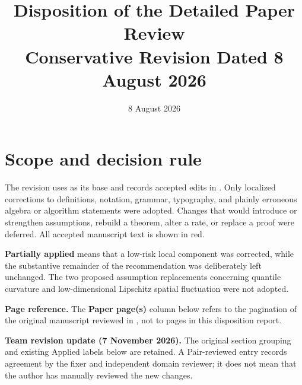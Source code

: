 \documentclass[10pt]{article}
\title{Disposition of the Detailed Paper Review\\
\large Conservative Revision Dated 8 August 2026}
\author{}
\date{8 August 2026}
\begin{document}
\maketitle

\section*{Scope and decision rule}
The revision uses  as its base and
records accepted edits in
. Only localized corrections to
definitions, notation, grammar, typography, and plainly erroneous algebra or
algorithm statements were adopted. Changes that would introduce or strengthen
assumptions, rebuild a theorem, alter a rate, or replace a proof were deferred.
All accepted manuscript text is shown in red.

\textbf{Partially applied} means that a low-risk local component was corrected,
while the substantive remainder of the recommendation was deliberately left
unchanged. The two proposed assumption replacements concerning quantile
curvature and low-dimensional Lipschitz spatial fluctuation were not adopted.

\textbf{Page reference.} The \textbf{Paper page(s)} column below refers to the
pagination of the original manuscript reviewed in
, not to pages in this disposition
report.

\textcolor{deferredred}{\textbf{Team revision update (7 November 2026).} The original section grouping and existing Applied labels below are retained. A Pair-reviewed entry records agreement by the fixer and independent domain reviewer; it does not mean that the author has manually reviewed the new changes.}
\end{document}

